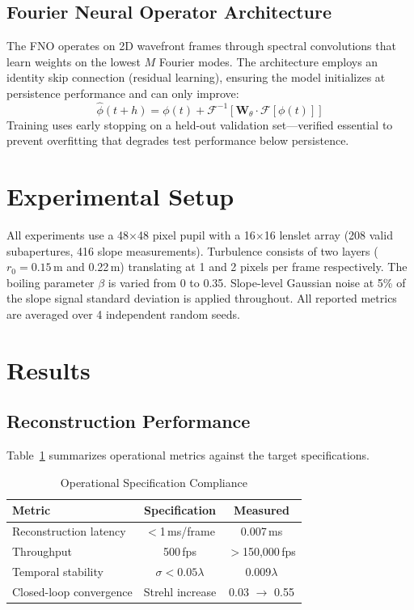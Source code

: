 \documentclass[conference]{IEEEtran}
\begin{document}
\subsection{Fourier Neural Operator Architecture}

The FNO operates on 2D wavefront frames through spectral convolutions that learn weights on the lowest $M$ Fourier modes. The architecture employs an identity skip connection (residual learning), ensuring the model initializes at persistence performance and can only improve:
\begin{equation}
\hat{\phi}(t+h) = \phi(t) + \mathcal{F}^{-1}\left[\mathbf{W}_\theta \cdot \mathcal{F}[\phi(t)]\right]
\end{equation}
Training uses early stopping on a held-out validation set---verified essential to prevent overfitting that degrades test performance below persistence.

\section{Experimental Setup}

All experiments use a 48$\times$48 pixel pupil with a 16$\times$16 lenslet array (208 valid subapertures, 416 slope measurements). Turbulence consists of two layers ($r_0 = 0.15$\,m and 0.22\,m) translating at 1 and 2 pixels per frame respectively. The boiling parameter $\beta$ is varied from 0 to 0.35. Slope-level Gaussian noise at 5\% of the slope signal standard deviation is applied throughout. All reported metrics are averaged over 4 independent random seeds.

\section{Results}

\subsection{Reconstruction Performance}

Table~\ref{tab:specs} summarizes operational metrics against the target specifications.

\begin{table}[h]
\centering
\caption{Operational Specification Compliance}
\label{tab:specs}
\begin{tabular}{lcc}
\toprule
\textbf{Metric} & \textbf{Specification} & \textbf{Measured} \\
\midrule
Reconstruction latency & $<$1\,ms/frame & 0.007\,ms \\
Throughput & 500\,fps & $>$150,000\,fps \\
Temporal stability & $\sigma < 0.05\lambda$ & 0.009$\lambda$ \\
Closed-loop convergence & Strehl increase & 0.03 $\rightarrow$ 0.55 \\
\bottomrule
\end{tabular}
\end{table}
\end{document}
